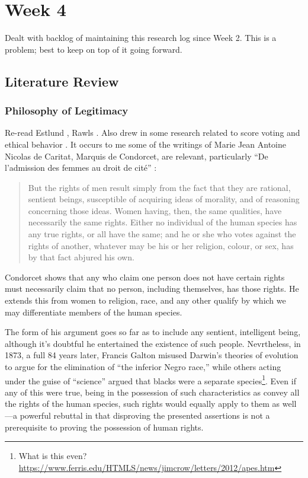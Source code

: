 
\section{Week 4}

Dealt with backlog of maintaining this research log since Week 2.  This is a problem; best to keep on top of it going forward.

\subsection{Literature Review}

\subsubsection{Philosophy of Legitimacy}

Re-read Estlund \autocite{Estlund2008}, Rawls \autocite{Rawls1997}.  Also drew in some research related to score voting and ethical behavior \autocite{Baujard2014,Feddersen2009}.  It occurs to me some of the writings of Marie Jean Antoine Nicolas de Caritat, Marquis de Condorcet, are relevant, particularly ``De l'admission des femmes au droit de cité'' \autocite{Condorcet1789}:

\begin{quote}
    But the rights of men result simply from the fact that they are rational, sentient beings, susceptible of acquiring ideas of morality, and of reasoning concerning those ideas. Women having, then, the same qualities, have necessarily the same rights. Either no individual of the human species has any true rights, or all have the same; and he or she who votes against the rights of another, whatever may be his or her religion, colour, or sex, has by that fact abjured his own.
\end{quote}

Condorcet shows that any who claim one person does not have certain rights must necessarily claim that no person, including themselves, has those rights.  He extends this from women to religion, race, and any other qualify by which we may differentiate members of the human species.

The form of his argument goes so far as to include any sentient, intelligent being, although it's doubtful he entertained the existence of such people.  Nevrtheless, in 1873, a full 84 years later, Francis Galton misused Darwin's theories of evolution to argue for the elimination of ``the inferior Negro race,'' while others acting under the guise of ``science'' argued that blacks were a separate species\footnote{What is this even? \url{https://www.ferris.edu/HTMLS/news/jimcrow/letters/2012/apes.htm}}.  Even if any of this were true, being in the possession of such characteristics as convey all the rights of the human species, such rights would equally apply to them as well—a powerful rebuttal in that disproving the presented assertions is not a prerequisite to proving the possession of human rights.

